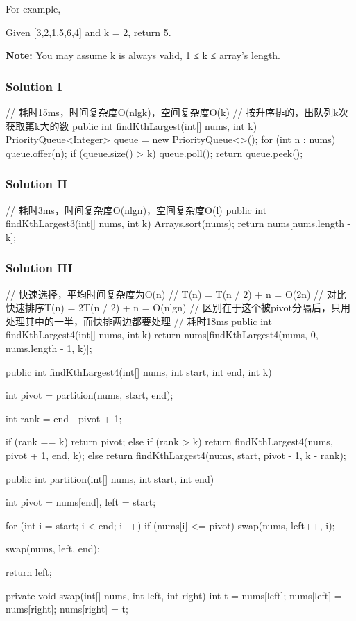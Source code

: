 For example,

Given [3,2,1,5,6,4] and k = 2, return 5.

\textbf{Note:}
You may assume k is always valid, 1 ≤ k ≤ array's length.
\subsubsection{Solution I}

\begin{Code}
// 耗时15ms，时间复杂度O(nlgk)，空间复杂度O(k)
// 按升序排的，出队列k次获取第k大的数
public int findKthLargest(int[] nums, int k) {
    PriorityQueue<Integer> queue = new PriorityQueue<>();
    for (int n : nums) {
        queue.offer(n);
        if (queue.size() > k) {
            queue.poll();
        }
    }
    return queue.peek();
}
\end{Code}

\subsubsection{Solution II}
\begin{Code}
// 耗时3ms，时间复杂度O(nlgn)，空间复杂度O(l)
public int findKthLargest3(int[] nums, int k) {
    Arrays.sort(nums);
    return nums[nums.length - k];
}
\end{Code}

\subsubsection{Solution III}
\begin{Code}
// 快速选择，平均时间复杂度为O(n)
// T(n) = T(n / 2) + n = O(2n)
// 对比快速排序T(n) = 2T(n / 2) + n = O(nlgn)
// 区别在于这个被pivot分隔后，只用处理其中的一半，而快排两边都要处理
// 耗时18ms
public int findKthLargest4(int[] nums, int k) {
    return nums[findKthLargest4(nums, 0, nums.length - 1, k)];
}

public int findKthLargest4(int[] nums, int start, int end, int k) {
    int pivot = partition(nums, start, end);

    int rank = end - pivot + 1;

    if (rank == k) {
        return pivot;
    } else if (rank > k) {
        return findKthLargest4(nums, pivot + 1, end, k);
    } else {
        return findKthLargest4(nums, start, pivot - 1, k - rank);
    }
}

public int partition(int[] nums, int start, int end) {
    int pivot = nums[end], left = start;

    for (int i = start; i < end; i++) {
        if (nums[i] <= pivot) {
            swap(nums, left++, i);
        }
    }

    swap(nums, left, end);

    return left;
}

private void swap(int[] nums, int left, int right) {
    int t = nums[left];
    nums[left] = nums[right];
    nums[right] = t;
}
\end{Code}

